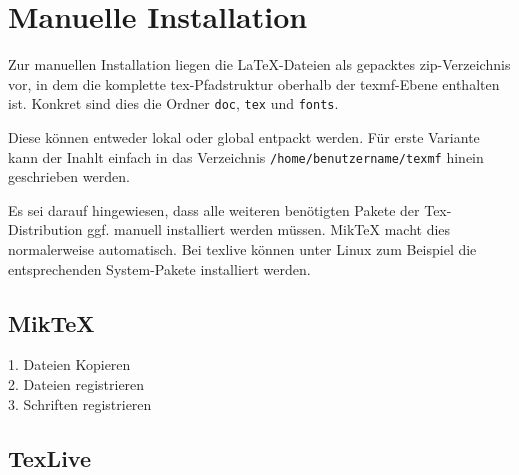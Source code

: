 \section{Manuelle Installation}

Zur manuellen Installation liegen die LaTeX-Dateien als gepacktes
zip-Verzeichnis vor, in dem die komplette tex-Pfadstruktur oberhalb der
texmf-Ebene enthalten ist. Konkret sind dies die Ordner
\lstinline{doc}, \lstinline{tex} und \lstinline{fonts}.

Diese können entweder lokal oder global entpackt werden.
Für erste Variante kann der Inahlt einfach in das Verzeichnis
\lstinline{/home/benutzername/texmf} hinein geschrieben werden.

Es sei darauf hingewiesen, dass alle weiteren benötigten Pakete der
Tex-Distribution ggf. manuell installiert werden müssen.
MikTeX macht dies normalerweise automatisch.
Bei texlive können unter Linux zum Beispiel die entsprechenden System-Pakete
installiert werden.


\subsection{MikTeX}

\begin{description}
  \item[1. Dateien Kopieren]
  \item[2. Dateien registrieren]
  \item[3. Schriften registrieren]
\end{description}


\subsection{TexLive}

